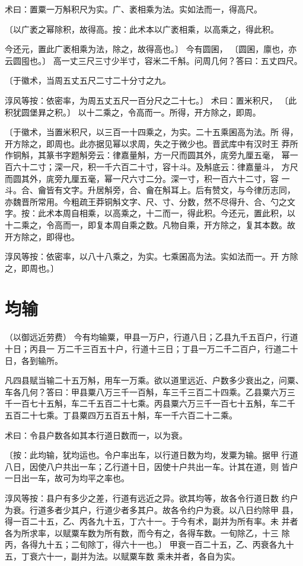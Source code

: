 \documentclass[a4paper,12pt,UTF8,twoside]{ctexbook}
\begin{document}
术曰：置粟一万斛积尺为实。广、袤相乘为法。实如法而一，得高尺。

〔以广袤之幂除积，故得高。按：此术本以广袤相乘，以高乘之，得此积。

今还元，置此广袤相乘为法，除之，故得高也。〕 今有圆囷， 〔圆囷，廪也，亦云圆囤也。〕 高一丈三尺三寸少半寸，容米二千斛。问周几何？答曰：五丈四尺。

〔于徽术，当周五丈五尺二寸二十分寸之九。

淳风等按：依密率，为周五丈五尺一百分尺之二十七。〕 术曰：置米积尺， 〔此积犹圆堡昪之积。〕 以十二乘之，令高而一。所得，开方除之，即周。

〔于徽术，当置米积尺，以三百一十四乘之，为实。二十五乘囷高为法。所 得，开方除之，即周也。此亦据见幂以求周，失之于微少也。晋武库中有汉时王 莽所作铜斛，其篆书字题斛旁云：律嘉量斛，方一尺而圆其外，庣旁九厘五毫， 幂一百六十二寸；深一尺，积一千六百二十寸，容十斗。及斛底云：律嘉量斗， 方尺而圆其外，庣旁九厘五毫，幂一尺六寸二分。深一寸，积一百六十二寸，容 一斗。合、龠皆有文字。升居斛旁，合、龠在斛耳上。后有赞文，与今律历志同， 亦魏晋所常用。今粗疏王莽铜斛文字、尺、寸、分数，然不尽得升、合、勺之文 字。按：此术本周自相乘，以高乘之，十二而一，得此积。今还元，置此积，以 十二乘之，令高而一，即复本周自乘之数。凡物自乘，开方除之，复其本数。故 开方除之，即得也。

淳风等按：依密率，以八十八乘之，为实。七乘囷高为法。实如法而一。开 方除之，即周也。〕 

\chapter{均输}
（以御远近劳费） 今有均输粟，甲县一万户，行道八日；乙县九千五百户，行道十日；丙县一 万二千三百五十户，行道十三日；丁县一万二千二百户，行道二十日，各到输所。

凡四县赋当输二十五万斛，用车一万乘。欲以道里远近、户数多少衰出之，问粟、 车各几何？答曰：甲县粟八万三千一百斛，车三千三百二十四乘。乙县粟六万三 千一百七十五斛，车二千五百二十七乘。丙县粟六万三千一百七十五斛，车二千 五百二十七乘。丁县粟四万五百五十斛，车一千六百二十二乘。

术曰：令县户数各如其本行道日数而一，以为衰。

〔按：此均输，犹均运也。令户率出车，以行道日数为均，发粟为输。据甲 行道八日，因使八户共出一车；乙行道十日，因使十户共出一车。计其在道，则 皆户一日出一车，故可为均平之率也。

淳风等按：县户有多少之差，行道有远近之异。欲其均等，故各令行道日数 约户为衰。行道多者少其户，行道少者多其户。故各令约户为衰。以八日约除甲 县，得一百二十五，乙、丙各九十五，丁六十一。于今有术，副并为所有率。未 并者各为所求率，以赋粟车数为所有数，而今有之，各得车数。一旬除乙，十三 除丙，各得九十五；二旬除丁，得六十一也。〕 甲衰一百二十五，乙、丙衰各九十五，丁衰六十一，副并为法。以赋粟车数 乘未并者，各自为实。
\end{document}
